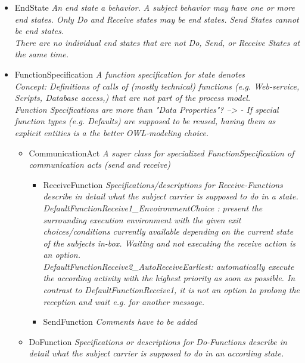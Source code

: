 \begin{itemize}
\begin{itemize}
	\item EndState \linebreak \textit{An end state a behavior. A subject behavior may have one or more end states. Only Do and Receive states may be end states. Send States cannot be end states.\\
	There are no individual end states that are not Do, Send, or Receive States at the same time.}
	\item FunctionSpecification \linebreak \textit{A function specification for state denotes\\
	Concept: Definitions of calls of (mostly technical) functions (e.g. Web-service, Scripts, Database access,) that are not part of the process model.\\
	Function Specifications are more than "Data Properties"? --> - If special function types (e.g. Defaults) are supposed to be reused, having them as explicit entities is a the better OWL-modeling choice.}
	\begin{itemize}
		\item CommunicationAct \linebreak \textit{A super class for specialized FunctionSpecification of communication acts (send and receive)}
		\begin{itemize}
			\item ReceiveFunction \linebreak \textit{Specifications/descriptions for Receive-Functions describe in detail what the subject carrier is supposed to do in a state.\\
			DefaultFunctionReceive1\_EnvoironmentChoice : present the surrounding execution environment with the given exit choices/conditions currently available depending on the current state of the subjects in-box. Waiting and not executing the receive action is an option.\\
			DefaultFunctionReceive2\_AutoReceiveEarliest: automatically execute the according activity with the highest priority as soon as possible. In contrast to DefaultFunctionReceive1, it is not an option to prolong the reception and wait e.g. for another message.}
			\item SendFunction \linebreak \textit{Comments have to be added}
		\end{itemize}
		\item DoFunction \linebreak \textit{Specifications or descriptions for Do-Functions describe in detail what the subject carrier is supposed to do in an according state.\\
}
\end{itemize}
\end{itemize}
\end{itemize}
